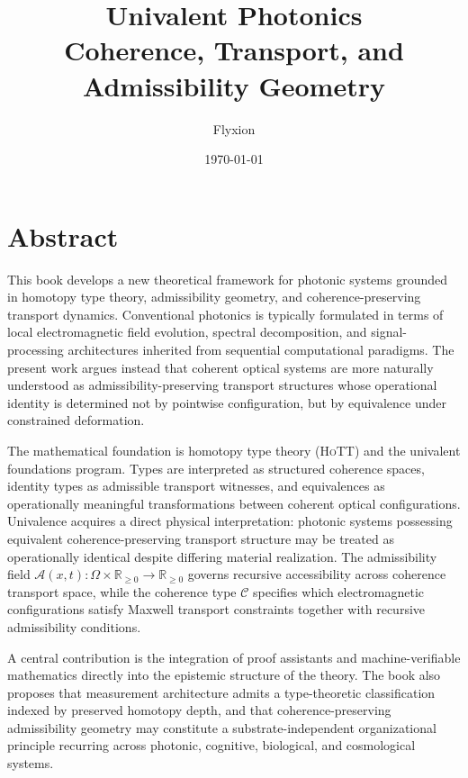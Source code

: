 \documentclass[11pt,openany]{book}
\title{
    \Huge Univalent Photonics \\
    \vspace{0.5em}
    \Large Coherence, Transport, and Admissibility Geometry
}
\author{Flyxion}
\date{\today}
\theoremstyle{definition}
\theoremstyle{plain}
\newcommand{\HoTT}{\textsc{HoTT}}
\begin{document}
\frontmatter
\maketitle
\tableofcontents


\chapter*{Abstract}

This book develops a new theoretical framework for photonic systems grounded in homotopy type theory, admissibility geometry, and coherence-preserving transport dynamics. Conventional photonics is typically formulated in terms of local electromagnetic field evolution, spectral decomposition, and signal-processing architectures inherited from sequential computational paradigms. The present work argues instead that coherent optical systems are more naturally understood as admissibility-preserving transport structures whose operational identity is determined not by pointwise configuration, but by equivalence under constrained deformation.

The mathematical foundation is homotopy type theory (\HoTT) and the univalent foundations program. Types are interpreted as structured coherence spaces, identity types as admissible transport witnesses, and equivalences as operationally meaningful transformations between coherent optical configurations. Univalence acquires a direct physical interpretation: photonic systems possessing equivalent coherence-preserving transport structure may be treated as operationally identical despite differing material realization. The admissibility field $\mathcal{A}(x,t) : \Omega \times \mathbb{R}_{\geq 0} \to \mathbb{R}_{\geq 0}$ governs recursive accessibility across coherence transport space, while the coherence type $\mathcal{C}$ specifies which electromagnetic configurations satisfy Maxwell transport constraints together with recursive admissibility conditions.

A central contribution is the integration of proof assistants and machine-verifiable mathematics directly into the epistemic structure of the theory. The book also proposes that measurement architecture admits a type-theoretic classification indexed by preserved homotopy depth, and that coherence-preserving admissibility geometry may constitute a substrate-independent organizational principle recurring across photonic, cognitive, biological, and cosmological systems.
\end{document}
